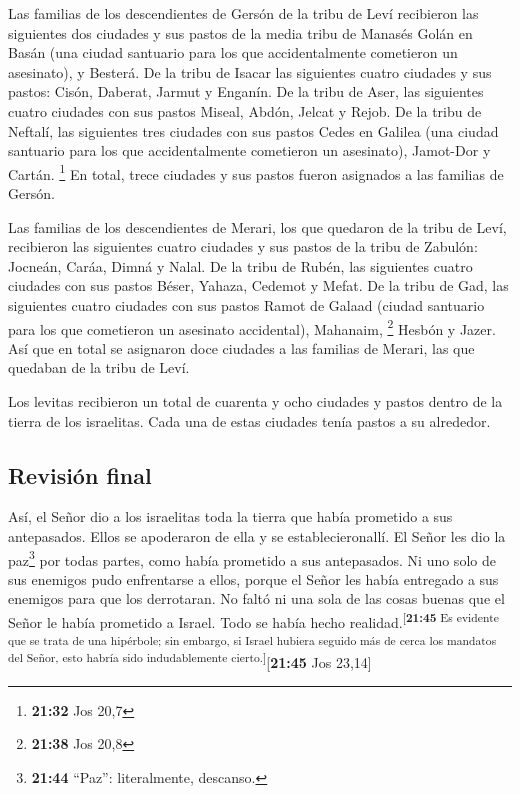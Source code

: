  Las familias de los descendientes de Gersón de la tribu
de Leví recibieron las siguientes dos ciudades y sus pastos de la media
tribu de Manasés Golán en Basán (una ciudad santuario para los que
accidentalmente cometieron un asesinato), y Besterá.  De
la tribu de Isacar las siguientes cuatro ciudades y sus pastos: Cisón,
Daberat,  Jarmut y Enganín.  De la tribu
de Aser, las siguientes cuatro ciudades con sus pastos Miseal, Abdón,
 Jelcat y Rejob.  De la tribu de Neftalí,
las siguientes tres ciudades con sus pastos Cedes en Galilea (una ciudad
santuario para los que accidentalmente cometieron un asesinato),
Jamot-Dor y Cartán. \footnote{\textbf{21:32} Jos 20,7} 
En total, trece ciudades y sus pastos fueron asignados a las familias de
Gersón.

 Las familias de los descendientes de Merari, los que
quedaron de la tribu de Leví, recibieron las siguientes cuatro ciudades
y sus pastos de la tribu de Zabulón: Jocneán, Caráa, 
Dimná y Nalal.  De la tribu de Rubén, las siguientes
cuatro ciudades con sus pastos Béser, Yahaza,  Cedemot y
Mefat.  De la tribu de Gad, las siguientes cuatro
ciudades con sus pastos Ramot de Galaad (ciudad santuario para los que
cometieron un asesinato accidental), Mahanaim, \footnote{\textbf{21:38}
  Jos 20,8}  Hesbón y Jazer.  Así que en
total se asignaron doce ciudades a las familias de Merari, las que
quedaban de la tribu de Leví.

 Los levitas recibieron un total de cuarenta y ocho
ciudades y pastos dentro de la tierra de los israelitas. 
Cada una de estas ciudades tenía pastos a su alrededor.

\hypertarget{revisiuxf3n-final}{%
\subsection{Revisión final}\label{revisiuxf3n-final}}

 Así, el Señor dio a los israelitas toda la tierra que
había prometido a sus antepasados. Ellos se apoderaron de ella y se
establecieronallí.  El Señor les dio la paz\footnote{\textbf{21:44}
  ``Paz'': literalmente, descanso.} por todas partes, como había
prometido a sus antepasados. Ni uno solo de sus enemigos pudo
enfrentarse a ellos, porque el Señor les había entregado a sus enemigos
para que los derrotaran.  No faltó ni una sola de las
cosas buenas que el Señor le había prometido a Israel. Todo se había
hecho realidad.\textsuperscript{{[}\textbf{21:45} Es evidente que se
trata de una hipérbole; sin embargo, si Israel hubiera seguido más de
cerca los mandatos del Señor, esto habría sido indudablemente
cierto.{]}}{[}\textbf{21:45} Jos 23,14{]}

